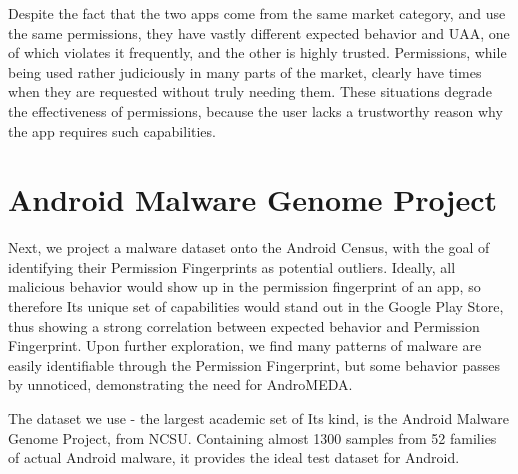 Despite the fact that the two apps come from the same market category, and use the same permissions, they have vastly different expected behavior and UAA, one of which violates it frequently, and the other is highly trusted. Permissions, while being used rather judiciously in many parts of the market, clearly have times when they are requested without truly needing them. These situations degrade the effectiveness of permissions, because the user lacks a trustworthy reason why the app requires such capabilities.







\section{Android Malware Genome Project}
Next, we project a malware dataset onto the Android Census, with the goal of identifying their Permission Fingerprints as potential outliers. Ideally, all malicious behavior would show up in the permission fingerprint of an app, so therefore Its unique set of capabilities would stand out in the Google Play Store, thus showing a strong correlation between expected behavior and Permission Fingerprint. Upon further exploration, we find many patterns of malware are easily identifiable through the Permission Fingerprint, but some behavior passes by unnoticed, demonstrating the need for AndroMEDA.

The dataset we use - the largest academic set of Its kind, is the Android Malware Genome Project\citep{zhou2012dissecting}, from NCSU. Containing almost 1300 samples from 52 families of actual Android malware, it provides the ideal test dataset for Android. 

